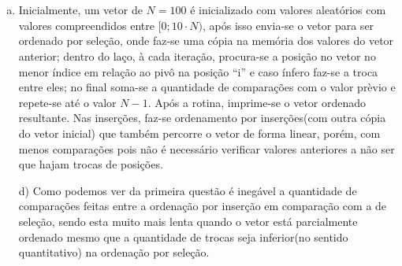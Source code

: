 \documentclass{article}
\begin{document}
\section{}
	\begin{enumerate}[a)]
		\item Inicialmente, um vetor de $N = 100$ é inicializado com valores aleatórios com valores compreendidos entre $[0; 10 \cdot N)$, após isso envia-se o vetor para ser ordenado por seleção, onde faz-se uma cópia na memória dos valores do vetor anterior; dentro do laço, à cada iteração, procura-se a posição no vetor no menor índice em relação ao pivô na posição ``i'' e caso ínfero faz-se a troca entre eles; no final soma-se a quantidade de comparações com o valor prèvio e repete-se até o valor $N - 1$. Após a rotina, imprime-se o vetor ordenado resultante.
		Nas inserções, faz-se ordenamento por inserções(com outra cópia do vetor inicial) que também percorre o vetor de forma linear, porém, com menos comparações pois não é necessário verificar valores anteriores a não ser que hajam trocas de posições.
\item[d)] Como podemos ver da primeira questão é inegável a quantidade de comparações feitas entre a ordenação por inserção em comparação com a de seleção, sendo esta muito mais lenta quando o vetor está parcialmente ordenado mesmo que a quantidade de trocas seja inferior(no sentido quantitativo) na ordenação por seleção.
	\end{enumerate}
\end{document}
